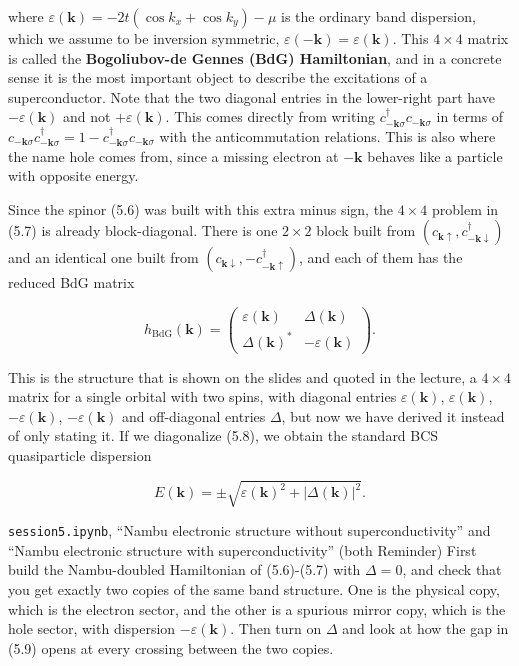 where $\varepsilon(\mathbf k) = -2t(\cos k_x + \cos k_y) - \mu$ is the ordinary band dispersion,
which we assume to be inversion symmetric, $\varepsilon(-\mathbf k) = \varepsilon(\mathbf k)$. This
$4\times 4$ matrix is called the \textbf{Bogoliubov-de Gennes (BdG) Hamiltonian}, and in a concrete
sense it is the most important object to describe the excitations of a superconductor. Note that
the two diagonal entries in the lower-right part have $-\varepsilon(\mathbf k)$ and not
$+\varepsilon(\mathbf k)$. This comes directly from writing $c_{-\mathbf k\sigma}^\dagger
c_{-\mathbf k\sigma}$ in terms of $c_{-\mathbf k\sigma}c_{-\mathbf k\sigma}^\dagger = 1 -
c_{-\mathbf k\sigma}^\dagger c_{-\mathbf
k\sigma}$ with the anticommutation relations. This is also where the name hole comes from, since a
missing electron at $-\mathbf k$ behaves like a particle with opposite energy.

Since the spinor (5.6) was built with this extra minus sign, the $4\times 4$ problem in (5.7) is
already block-diagonal. There is one $2\times 2$ block built from $(c_{\mathbf k\uparrow},
c_{-\mathbf k\downarrow}^\dagger)$ and an identical one built from $(c_{\mathbf k\downarrow},
-c_{-\mathbf
k\uparrow}^\dagger)$, and each of them has the reduced BdG matrix

\begin{equation}
h_{\text{BdG}}(\mathbf k) = \begin{pmatrix} \varepsilon(\mathbf k) & \Delta(\mathbf k) \\ \Delta(\mathbf k)^* & -\varepsilon(\mathbf k)\end{pmatrix}.
\end{equation}

This is the structure that is shown on the slides and quoted in the lecture, a $4\times 4$ matrix
for a single orbital with two spins, with diagonal entries $\varepsilon(\mathbf k)$,
$\varepsilon(\mathbf k)$, $-\varepsilon(\mathbf k)$,
$-\varepsilon(\mathbf k)$
and off-diagonal entries $\Delta$, but now we have derived it instead of only stating it. If we
diagonalize (5.8), we obtain the standard BCS quasiparticle dispersion

\begin{equation}
E(\mathbf k) = \pm\sqrt{\varepsilon(\mathbf k)^2 + |\Delta(\mathbf k)|^2}.
\end{equation}

\begin{notebookbox}{\texttt{session5.ipynb}, ``Nambu electronic structure without superconductivity'' and ``Nambu electronic structure with superconductivity'' (both Reminder)}
First build the Nambu-doubled Hamiltonian of (5.6)-(5.7) with $\Delta = 0$, and check that you get
exactly two copies of the same band structure. One is the physical copy, which is the electron
sector, and the other is a spurious mirror copy, which is the hole sector, with dispersion
$-\varepsilon(\mathbf k)$. Then turn on $\Delta$ and look at how the gap in (5.9) opens at every
crossing between the two copies.
\end{notebookbox}


